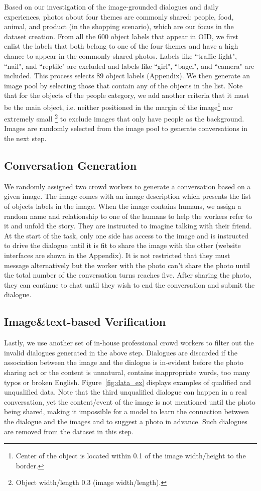 \documentclass[11pt,a4paper]{article}
\begin{document}
Based on our investigation of the image-grounded dialogues and daily experiences, photos about four themes are commonly shared: people, food, animal, and product (in the shopping scenario), which are our focus in the dataset creation. From all the 600 object labels that appear in OID, we first enlist the labels that both belong to one of the four themes and have a high chance to appear in the commonly-shared photos. Labels like ``traffic light", ``nail", and ``reptile" are excluded and labels like ``girl", ``bagel", and ``camera" are included. This process selects 89 object labels (Appendix). We then generate an image pool by selecting those that contain any of the objects in the list. Note that for the objects of the people category, we add another criteria that it must be the main object, i.e. neither positioned in the margin of the image\footnote{Center of the object is located within 0.1 of the image width/height to the border.} nor extremely small \footnote{Object width/length  0.3  (image width/length).} to exclude images that only have people as the background. Images are randomly selected from the image pool to generate conversations in the next step. 


\subsection{Conversation Generation}
We randomly assigned two crowd workers to generate a conversation based on a given image. The image comes with an image description which presents the list of objects labels in the image. When the image contains humans, we assign a random name and relationship to one of the humans to help the workers refer to it and unfold the story. They are instructed to imagine talking with their friend. At the start of the task, only one side has access to the image and is instructed to drive the dialogue until it is fit to share the image with the other (website interfaces are shown in the Appendix). It is not restricted that they must message alternatively but the worker with the photo can't share the photo until the total number of the conversation turns reaches five. After sharing the photo, they can continue to chat until they wish to end the conversation and submit the dialogue. 

\subsection{Image\&text-based Verification}
Lastly, we use another set of in-house professional crowd workers to filter out the invalid dialogues generated in the above step. Dialogues are discarded if the association between the image and the dialogue is in-evident before the photo sharing act or the content is unnatural, contains inappropriate words, too many typos or broken English.
Figure~\ref{fig:data_ex} displays examples of qualified and unqualified data. Note that the third unqualified dialogue can happen in a real conversation, yet the content/event of the image is not mentioned until the photo being shared, making it impossible for a model to learn the connection between the dialogue and the images and to suggest a photo in advance. Such dialogues are removed from the dataset in this step.
\end{document}
